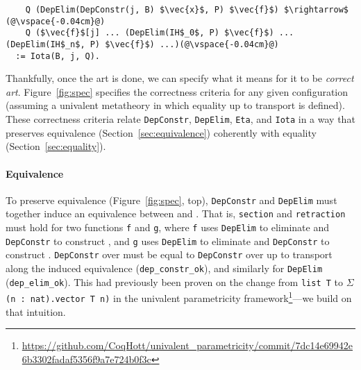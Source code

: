 \begin{figure*}
\begin{lstlisting}
    Q (DepElim(DepConstr(j, B) $\vec{x}$, P) $\vec{f}$) $\rightarrow$ (@\vspace{-0.04cm}@)
    Q ($\vec{f}$[j] ... (DepElim(IH$_0$, P) $\vec{f}$) ... (DepElim(IH$_n$, P) $\vec{f}$) ...)(@\vspace{-0.04cm}@)
  := Iota(B, j, Q).
\end{lstlisting}
\vspace{-0.3cm}
\caption{Correctness criteria for a configuration \lstinline{(DepConstr, DepElim), (Eta, Iota)} to ensure that the transformation
preserves equivalence (top) coherently with equality (bottom). Throughout, $\vec{f}$, $\vec{x}$, and $\vec{\mathtt{IH}}$ represent
eliminator cases, constructor arguments, and inductive hypotheses, respectively.}
\label{fig:spec}
\end{figure*} %

Thankfully, once the art is done, we can specify what it means for it to be \textit{correct art}.
Figure~\ref{fig:spec} specifies the correctness criteria for any given configuration (assuming a univalent metatheory in which equality up
to transport is defined).
These correctness criteria relate \lstinline{DepConstr}, \lstinline{DepElim}, \lstinline{Eta}, and \lstinline{Iota}
in a way that preserves equivalence (Section~\ref{sec:equivalence}) coherently with equality (Section~\ref{sec:equality}).

\paragraph{Equivalence}
To preserve equivalence (Figure~\ref{fig:spec}, top), \lstinline{DepConstr} and \lstinline{DepElim} must together induce an equivalence between \A and \B.
That is, \lstinline{section} and \lstinline{retraction} must hold for two functions \lstinline{f} and \lstinline{g},
where \lstinline{f} uses \lstinline{DepElim} to eliminate \A and \lstinline{DepConstr} to construct \B, and \lstinline{g} uses 
\lstinline{DepElim} to eliminate \B and \lstinline{DepConstr} to construct \A.
\lstinline{DepConstr} over \B must be equal to \lstinline{DepConstr} over \A up to transport along the induced equivalence (\lstinline{dep_constr_ok}), 
and similarly for \lstinline{DepElim} (\lstinline{dep_elim_ok}).
This had previously been proven on the change from \lstinline{list T} to $\Sigma$\lstinline{(n : nat).vector T n)} in the 
univalent parametricity framework\footnote{\url{https://github.com/CoqHott/univalent_parametricity/commit/7dc14e69942e6b3302fadaf5356f9a7e724b0f3c}}---we build on that intuition.


